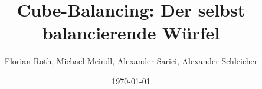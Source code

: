 \begin{titlepage}
\title{\textbf{Cu}be-\textbf{Ba}lancing: Der selbst balancierende Würfel}
\author{Florian Roth, Michael Meindl, Alexander Sarici, Alexander Schleicher}
\date{\today}
\end{titlepage}